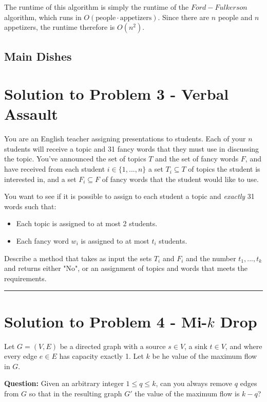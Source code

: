 \documentclass[11pt]{article}
\begin{document}
The runtime of this algorithm is simply the runtime of the $Ford-Fulkerson$ algorithm, which runs in $O(\text{people} \cdot \text{appetizers})$. Since there are $n$ people and $n$ appetizers, the runtime therefore is $O(n^2)$.

\subsection*{Main Dishes}

\pagebreak

\section*{Solution to Problem 3 - Verbal Assault}

You are an English teacher assigning presentations to students. Each of your $n$ students will receive a topic and 31 fancy words that they must use in discussing the topic. You've announced the set of topics $T$ and the set of fancy words $F$, and have received from each student $i \in \{1, ..., n\}$ a set $T_i \subseteq T$ of topics the student is interested in, and a set $F_i \subseteq F$ of fancy words that the student would like to use.

You want to see if it is possible to assign to each student a topic and \textit{exactly} 31 words such that:
\begin{itemize}
	\item Each topic is assigned to at most 2 students.
	\item Each fancy word $w_i$ is assigned to at most $t_i$ students.
\end{itemize}

Describe a method that takes as input the sets $T_i$ and $F_i$ and the number $t_1, ..., t_k$ and returns either "No", or an assignment of topics and words that meets the requirements.

\noindent\rule{17cm}{0.4pt}

\pagebreak

\section*{Solution to Problem 4 - Mi-$k$ Drop}

Let $G = (V,E)$ be a directed graph with a source $s \in V$, a sink $t \in V$, and where every edge $e \in E$ has capacity exactly 1. Let $k$ be he value of the maximum flow in $G$.

\textbf{Question:} Given an arbitrary integer $1 \leq q \leq k$, can you always remove $q$ edges from $G$ so that in the resulting graph $G'$ the value of the maximum flow is $k-q$?
\end{document}

